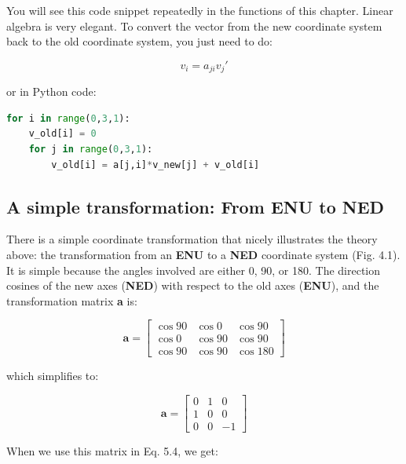 \documentclass[a4paper , 12pt]{book}
\begin{document}
You will see this code snippet repeatedly in the functions of this chapter. Linear algebra is very elegant. To convert the vector from the new coordinate system back to the old coordinate system, you just need to do:

\begin{equation}
    v_i=a_{ji}v_j\text{$'$}
\end{equation}

or in Python code:

\begin{center}
\begin{lstlisting}[language=Python, frame=single]
for i in range(0,3,1):
    v_old[i] = 0
    for j in range(0,3,1):
        v_old[i] = a[j,i]*v_new[j] + v_old[i]
\end{lstlisting}
\end{center}

\subsection{A simple transformation: From \textbf{ENU} to \textbf{NED}}

There is a simple coordinate transformation that nicely illustrates the theory above: the transformation from an \textbf{ENU} to a \textbf{NED} coordinate system (Fig. 4.1). It is simple because the angles involved are either 0, 90, or 180\degree. The direction cosines of the new axes (\textbf{NED}) with respect to the old axes (\textbf{ENU}), and the transformation matrix \textbf{a} is:

\begin{equation}
    \textbf{a}=
    \begin{bmatrix}
    \cos{90} & \cos{0} & \cos{90} \\
    \cos{0} & \cos{90} & \cos{90} \\
    \cos{90} & \cos{90} & \cos{180}
\end{bmatrix}
\end{equation}

which simplifies to:

\begin{equation}
    \textbf{a}=
    \begin{bmatrix}
    0 & 1 & 0 \\
    1 & 0 & 0 \\
    0 & 0 & -1
\end{bmatrix}
\end{equation}

When we use this matrix in Eq. 5.4, we get:
\end{document}
